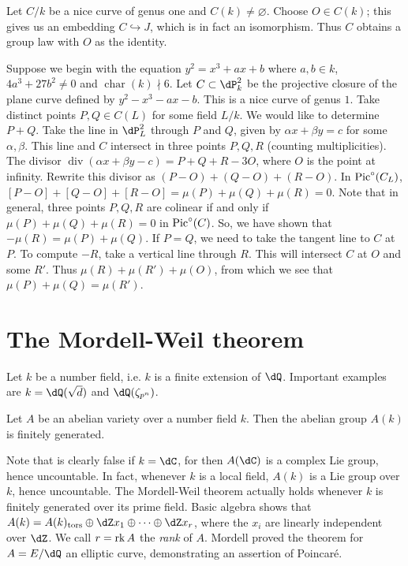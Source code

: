 \documentclass{article}
\begin{document}
\begin{example}
Let $C/k$ be a nice curve of genus one and $C(k)\ne\varnothing$. Choose 
$O\in C(k)$; this gives us an embedding $C\hookrightarrow J$, which is in fact 
an isomorphism. Thus $C$ obtains a group law with $O$ as the identity. 

Suppose we begin with the equation $y^2=x^3 + a x+b$ where $a,b\in k$, 
$4 a^3+27 b^2\ne 0$ and $\operatorname{char}(k)\nmid 6$. Let 
$C\subset \dP_k^2$ be the projective closure of the plane curve defined 
by $y^2-x^3-a x-b$. This is a nice curve of genus $1$. Take distinct points 
$P,Q\in C(L)$ for some field $L/k$. We would like to determine $P+Q$. Take the 
line in $\dP_L^2$ through $P$ and $Q$, given by $\alpha x+\beta y = c$ 
for some $\alpha,\beta$. This line and $C$ intersect in three points $P,Q,R$ 
(counting multiplicities). The divisor 
$\operatorname{div}(\alpha x+\beta y - c) = P+Q+R - 3 O$, where $O$ is the 
point at infinity. Rewrite this divisor as $(P-O)+(Q-O)+(R-O)$. In 
$\operatorname{Pic}^\circ(C_L)$, $[P-O] + [Q-O] + [R-O] = \mu(P)+\mu(Q)+\mu(R) = 0$. Note 
that in general, three points $P,Q,R$ are colinear if and only if 
$\mu(P)+\mu(Q)+\mu(R) = 0$ in $\operatorname{Pic}^\circ(C)$. So, we have shown that 
$-\mu(R) = \mu(P)+\mu(Q)$. If $P=Q$, we need to take the tangent line to $C$ at 
$P$. To compute $-R$, take a vertical line through $R$. This will intersect 
$C$ at $O$ and some $R'$. Thus $\mu(R)+\mu(R')+\mu(O)$, from which we see that 
$\mu(P)+\mu(Q) = \mu(R')$. 
\end{example}










\section{The Mordell-Weil theorem}

Let $k$ be a number field, i.e. $k$ is a finite extension of $\dQ$. Important 
examples are $k=\dQ(\sqrt d)$ and $\dQ(\zeta_{p^n})$. 

\begin{theorem}
Let $A$ be an abelian variety over a number field $k$. Then the abelian group 
$A(k)$ is finitely generated.
\end{theorem}

Note that is clearly false if $k=\dC$, for then $A(\dC)$ is a complex Lie 
group, hence uncountable. In fact, whenever $k$ is a local field, $A(k)$ is a 
Lie group over $k$, hence uncountable. The Mordell-Weil theorem actually holds 
whenever $k$ is finitely generated over its prime field. Basic algebra shows 
that $A(k) = A(k)_\text{tors}\oplus \dZ x_1\oplus \cdots \oplus \dZ x_r$, where 
the $x_i$ are linearly independent over $\dZ$. We call $r=\operatorname{rk} A$ 
the \emph{rank} of $A$. Mordell proved the theorem for $A=E/\dQ$ an elliptic 
curve, demonstrating an assertion of Poincar\'e.
\end{document}
